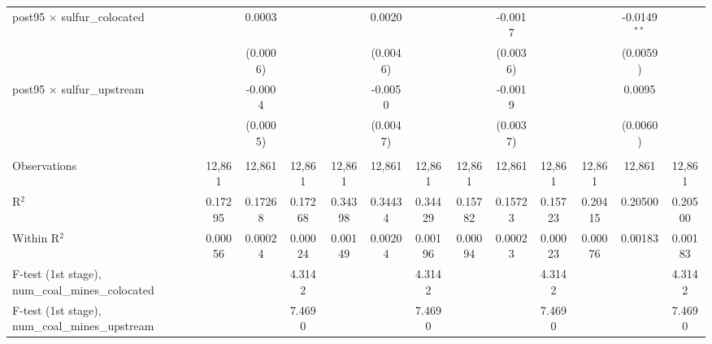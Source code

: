 \begin{table}[htbp]
\begin{adjustbox}{width = \textwidth, center}
\begin{tabular}{lcccccccccccc}
         post95 $\times$ sulfur\_colocated                  &               & 0.0003        &               &               & 0.0020        &               &               & -0.0017       &               &               & -0.0149$^{**}$ &   \\   
                                                            &               & (0.0006)      &               &               & (0.0046)      &               &               & (0.0036)      &               &               & (0.0059)       &   \\   
         post95 $\times$ sulfur\_upstream                   &               & -0.0004       &               &               & -0.0050       &               &               & -0.0019       &               &               & 0.0095         &   \\   
                                                            &               & (0.0005)      &               &               & (0.0047)      &               &               & (0.0037)      &               &               & (0.0060)       &   \\   
          \\
         Observations                                       & 12,861        & 12,861        & 12,861        & 12,861        & 12,861        & 12,861        & 12,861        & 12,861        & 12,861        & 12,861        & 12,861         & 12,861\\  
         R$^2$                                              & 0.17295       & 0.17268       & 0.17268       & 0.34398       & 0.34434       & 0.34429       & 0.15782       & 0.15723       & 0.15723       & 0.20415       & 0.20500        & 0.20500\\  
         Within R$^2$                                       & 0.00056       & 0.00024       & 0.00024       & 0.00149       & 0.00204       & 0.00196       & 0.00094       & 0.00023       & 0.00023       & 0.00076       & 0.00183        & 0.00183\\  
         F-test (1st stage), num\_coal\_mines\_colocated    &               &               & 4.3142        &               &               & 4.3142        &               &               & 4.3142        &               &                & 4.3142\\  
         F-test (1st stage), num\_coal\_mines\_upstream     &               &               & 7.4690        &               &               & 7.4690        &               &               & 7.4690        &               &                & 7.4690\\  

\end{tabular}
\end{adjustbox}
\end{table}
